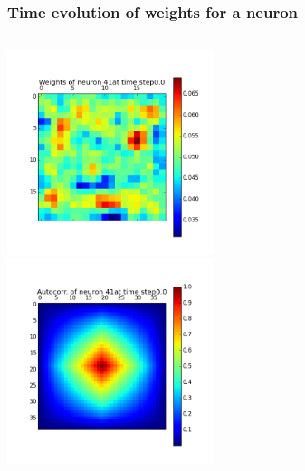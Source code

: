 \begin{frame}
\frametitle{Time evolution of weights for a neuron}
\begin{columns}[t]
\centering
\includegraphics[width=6cm,height=6cm]{neurons/neuron_w_41_t_0.png}\\
\centering
\includegraphics[width=6cm,height=6cm]{neurons/neuron_a_41_t_0.png}\\
\end{columns}
\end{frame}

